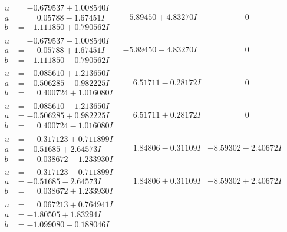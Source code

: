 \documentclass[1p]{elsarticle_modified}
\theoremstyle{definition}
\begin{document}
$$\begin{array}{c|c|c}
\begin{aligned}
u &= -0.679537 + 1.008540 I \\
a &= \phantom{-}0.05788 - 1.67451 I \\
b &= -1.111850 + 0.790562 I\end{aligned}
 & -5.89450 + 4.83270 I & \phantom{-0.000000 } 0 \\ \hline\begin{aligned}
u &= -0.679537 - 1.008540 I \\
a &= \phantom{-}0.05788 + 1.67451 I \\
b &= -1.111850 - 0.790562 I\end{aligned}
 & -5.89450 - 4.83270 I & \phantom{-0.000000 } 0 \\ \hline\begin{aligned}
u &= -0.085610 + 1.213650 I \\
a &= -0.506285 - 0.982225 I \\
b &= \phantom{-}0.400724 + 1.016080 I\end{aligned}
 & \phantom{-}6.51711 - 0.28172 I & \phantom{-0.000000 } 0 \\ \hline\begin{aligned}
u &= -0.085610 - 1.213650 I \\
a &= -0.506285 + 0.982225 I \\
b &= \phantom{-}0.400724 - 1.016080 I\end{aligned}
 & \phantom{-}6.51711 + 0.28172 I & \phantom{-0.000000 } 0 \\ \hline\begin{aligned}
u &= \phantom{-}0.317123 + 0.711899 I \\
a &= -0.51685 + 2.64573 I \\
b &= \phantom{-}0.038672 - 1.233930 I\end{aligned}
 & \phantom{-}1.84806 - 0.31109 I & -8.59302 - 2.40672 I \\ \hline\begin{aligned}
u &= \phantom{-}0.317123 - 0.711899 I \\
a &= -0.51685 - 2.64573 I \\
b &= \phantom{-}0.038672 + 1.233930 I\end{aligned}
 & \phantom{-}1.84806 + 0.31109 I & -8.59302 + 2.40672 I \\ \hline\begin{aligned}
u &= \phantom{-}0.067213 + 0.764941 I \\
a &= -1.80505 + 1.83294 I \\
b &= -1.099080 - 0.188046 I\end{aligned}

\end{array}$$
\end{document}
